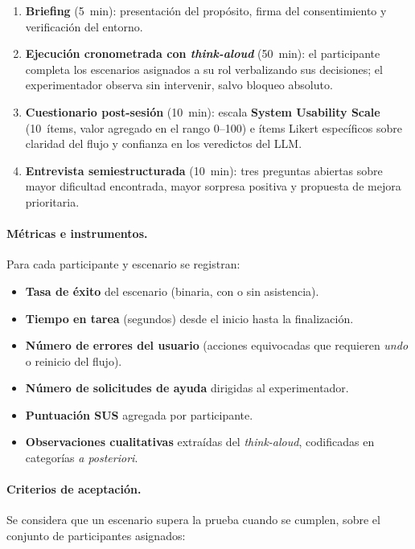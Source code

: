 \begin{enumerate}
	\item \textbf{Briefing} (5~min): presentación del propósito, firma del
	      consentimiento y verificación del entorno.
	\item \textbf{Ejecución cronometrada con \textit{think-aloud}} (50~min): el
	      participante completa los escenarios asignados a su rol verbalizando sus
	      decisiones; el experimentador observa sin intervenir, salvo bloqueo absoluto.
	\item \textbf{Cuestionario post-sesión} (10~min): escala
	      \textbf{System Usability Scale} (10~ítems, valor agregado en el rango 0--100) e
	      ítems Likert específicos sobre claridad del flujo y confianza en los veredictos
	      del LLM.
	\item \textbf{Entrevista semiestructurada} (10~min): tres preguntas abiertas sobre
	      mayor dificultad encontrada, mayor sorpresa positiva y propuesta de mejora
	      prioritaria.
\end{enumerate}

\paragraph{Métricas e instrumentos.} Para cada participante y escenario se
registran:

\begin{itemize}
	\item \textbf{Tasa de éxito} del escenario (binaria, con o sin asistencia).
	\item \textbf{Tiempo en tarea} (segundos) desde el inicio hasta la finalización.
	\item \textbf{Número de errores del usuario} (acciones equivocadas que requieren
	      \textit{undo} o reinicio del flujo).
	\item \textbf{Número de solicitudes de ayuda} dirigidas al experimentador.
	\item \textbf{Puntuación SUS} agregada por participante.
	\item \textbf{Observaciones cualitativas} extraídas del \textit{think-aloud}, codificadas
	      en categorías \textit{a posteriori}.
\end{itemize}

\paragraph{Criterios de aceptación.} Se considera que un escenario supera la
prueba cuando se cumplen, sobre el conjunto de participantes asignados:

